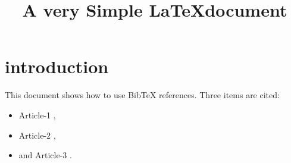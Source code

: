 \documentclass{article}
\begin{document}
\title{A very Simple \LaTeX document}
\date{}
\maketitle

\section{introduction}

This document shows how to use BibTeX references. Three items 
are cited:

\begin{itemize}
\item Article-1 \cite{allan:2000}, 
\item Article-2 \cite{arakawa:1977}, 
\item and Article-3 \cite{berger:2010}. 
\end{itemize}


\medskip
 


\end{document}
